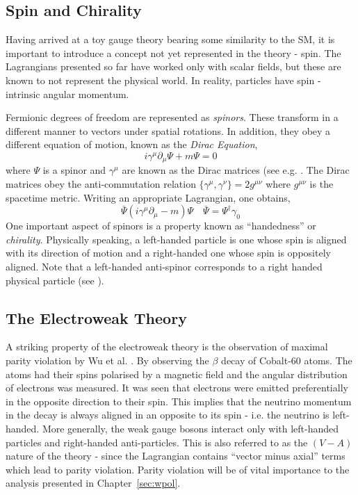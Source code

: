 \subsection{Spin and Chirality}
Having arrived at a toy gauge theory bearing some similarity to the \ac{SM}, it
is important to introduce a concept not yet represented in the theory -
spin. The Lagrangians presented so far have worked only with scalar fields, but
these are known to not represent the physical world. In reality, particles have
spin - intrinsic angular momentum.

Fermionic degrees of freedom are represented as \emph{spinors}. These transform
in a different manner to vectors under spatial rotations. In addition, they obey
a different equation of motion, known as the \emph{Dirac Equation},
\begin{equation}
i\gamma^\mu \partial_{\mu}\Psi + m\Psi = 0
\end{equation}
where $\Psi$ is a spinor and $\gamma^{\mu}$ are known as the Dirac matrices
(see e.g. \cite{aitchison}. The Dirac matrices obey the anti-commutation
relation $\{\gamma^{\mu}, \gamma^{\nu}\} = 2g^{\mu\nu}$ where $g^{\mu\nu}$ is
the spacetime metric. Writing an appropriate Lagrangian, one obtains,
\begin{equation}
\bar{\Psi} \left (i\gamma^{\mu}\partial_{\mu} -m\right)\Psi \quad \bar{\Psi} =
\Psi^{\dagger}\gamma_0
\end{equation}
One important aspect of spinors is a property known as ``handedness'' or
\emph{chirality}. Physically speaking, a left-handed particle is one whose spin
is aligned with its direction of motion and a right-handed one whose spin is
oppositely aligned. Note that a left-handed anti-spinor corresponds to a right
handed physical particle (see \cite{peskin_schroeder}).

\subsection{The Electroweak Theory}
A striking property of the electroweak theory is the observation of maximal
parity violation by Wu et al. \cite{wu_parity}. By observing the $\beta$ decay of
Cobalt-60 atoms. The atoms had their spins polarised by a magnetic field and the
angular distribution of electrons was measured. It was seen that electrons were
emitted preferentially in the opposite direction to their spin. This implies
that the neutrino momentum in the decay is always aligned in an opposite to its
spin - i.e. the neutrino is left-handed. More generally, the weak gauge bosons
interact only with left-handed particles and right-handed anti-particles. This
is also referred to as the $(V-A)$ nature of the theory - since the Lagrangian
contains ``vector minus axial'' terms which lead to parity violation. Parity
violation will be of vital importance to the analysis presented in
Chapter~\ref{sec:wpol}.

